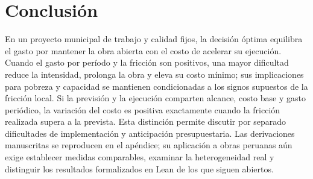 \documentclass[11pt]{article}
\begin{document}
\section{Conclusión}\label{sec:conclusion}
En un proyecto municipal de trabajo y calidad fijos, la decisión óptima equilibra el gasto por mantener la obra abierta con el costo de acelerar su ejecución. Cuando el gasto por período y la fricción son positivos, una mayor dificultad reduce la intensidad, prolonga la obra y eleva su costo mínimo; sus implicaciones para pobreza y capacidad se mantienen condicionadas a los signos supuestos de la fricción local. Si la previsión y la ejecución comparten alcance, costo base y gasto periódico, la variación del costo es positiva exactamente cuando la fricción realizada supera a la prevista. Esta distinción permite discutir por separado dificultades de implementación y anticipación presupuestaria. Las derivaciones manuscritas se reproducen en el apéndice; su aplicación a obras peruanas aún exige establecer medidas comparables, examinar la heterogeneidad real y distinguir los resultados formalizados en Lean de los que siguen abiertos.



\clearpage

\end{document}
